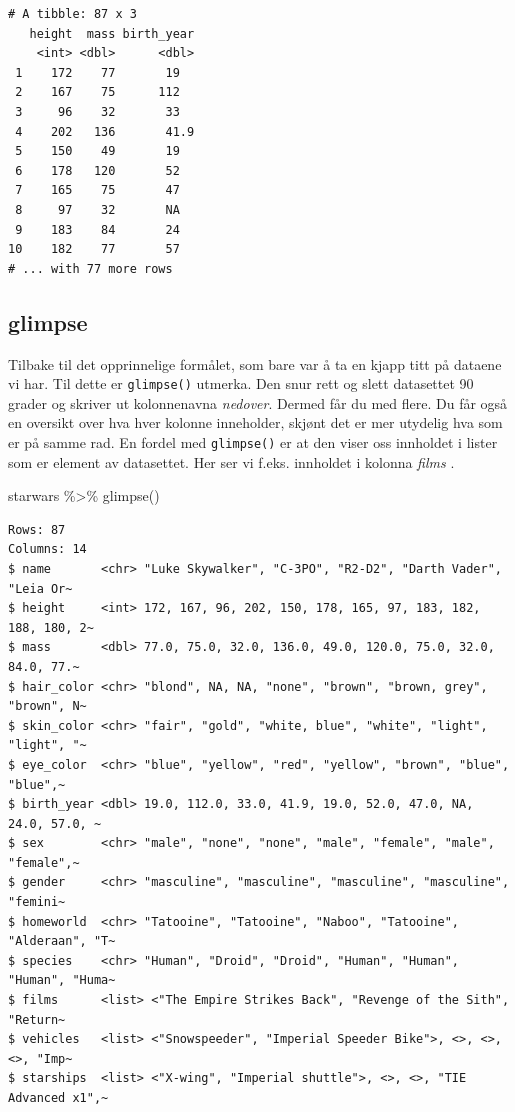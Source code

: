 \documentclass[
  letterpaper,
  DIV=11,
  numbers=noendperiod]{scrreprt}
\newenvironment{Shaded}{\begin{snugshade}}{\end{snugshade}}
\newcommand{\FunctionTok}[1]{\textcolor[rgb]{0.28,0.35,0.67}{#1}}
\newcommand{\NormalTok}[1]{\textcolor[rgb]{0.00,0.23,0.31}{#1}}
\newcommand{\SpecialCharTok}[1]{\textcolor[rgb]{0.37,0.37,0.37}{#1}}
\begin{document}
\begin{verbatim}
# A tibble: 87 x 3
   height  mass birth_year
    <int> <dbl>      <dbl>
 1    172    77       19  
 2    167    75      112  
 3     96    32       33  
 4    202   136       41.9
 5    150    49       19  
 6    178   120       52  
 7    165    75       47  
 8     97    32       NA  
 9    183    84       24  
10    182    77       57  
# ... with 77 more rows
\end{verbatim}

\hypertarget{glimpse}{%
\subsection{glimpse}\label{glimpse}}

Tilbake til det opprinnelige formålet, som bare var å ta en kjapp titt
på dataene vi har. Til dette er \texttt{glimpse()} utmerka. Den snur
rett og slett datasettet 90 grader og skriver ut kolonnenavna
\emph{nedover}. Dermed får du med flere. Du får også en oversikt over
hva hver kolonne inneholder, skjønt det er mer utydelig hva som er på
samme rad. En fordel med \texttt{glimpse()} er at den viser oss
innholdet i lister som er element av datasettet. Her ser vi f.eks.
innholdet i kolonna \emph{films} .

\begin{Shaded}
\begin{Highlighting}[]
\NormalTok{starwars }\SpecialCharTok{\%\textgreater{}\%} \FunctionTok{glimpse}\NormalTok{()}
\end{Highlighting}
\end{Shaded}

\begin{verbatim}
Rows: 87
Columns: 14
$ name       <chr> "Luke Skywalker", "C-3PO", "R2-D2", "Darth Vader", "Leia Or~
$ height     <int> 172, 167, 96, 202, 150, 178, 165, 97, 183, 182, 188, 180, 2~
$ mass       <dbl> 77.0, 75.0, 32.0, 136.0, 49.0, 120.0, 75.0, 32.0, 84.0, 77.~
$ hair_color <chr> "blond", NA, NA, "none", "brown", "brown, grey", "brown", N~
$ skin_color <chr> "fair", "gold", "white, blue", "white", "light", "light", "~
$ eye_color  <chr> "blue", "yellow", "red", "yellow", "brown", "blue", "blue",~
$ birth_year <dbl> 19.0, 112.0, 33.0, 41.9, 19.0, 52.0, 47.0, NA, 24.0, 57.0, ~
$ sex        <chr> "male", "none", "none", "male", "female", "male", "female",~
$ gender     <chr> "masculine", "masculine", "masculine", "masculine", "femini~
$ homeworld  <chr> "Tatooine", "Tatooine", "Naboo", "Tatooine", "Alderaan", "T~
$ species    <chr> "Human", "Droid", "Droid", "Human", "Human", "Human", "Huma~
$ films      <list> <"The Empire Strikes Back", "Revenge of the Sith", "Return~
$ vehicles   <list> <"Snowspeeder", "Imperial Speeder Bike">, <>, <>, <>, "Imp~
$ starships  <list> <"X-wing", "Imperial shuttle">, <>, <>, "TIE Advanced x1",~
\end{verbatim}
\end{document}
